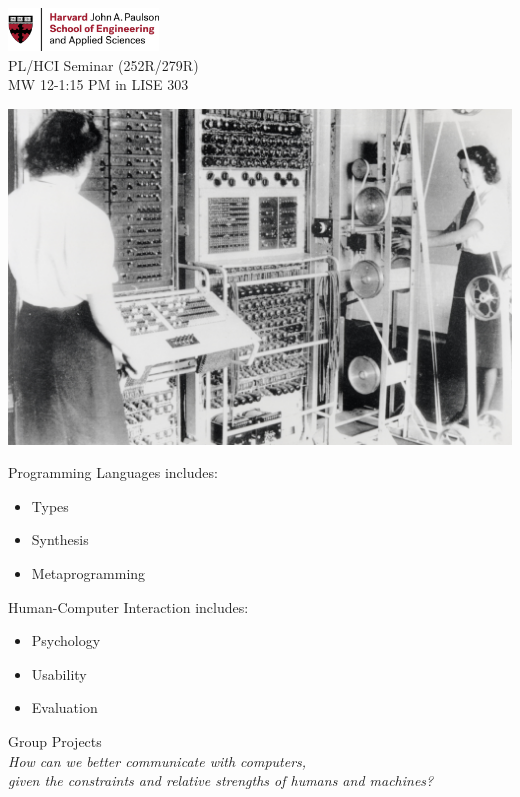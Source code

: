 \documentclass[14pt]{extarticle}
\begin{document}
\begin{center}
\includegraphics[width=0.3\textwidth]{H_SEAS_logo_RGB.jpg}
\\
\huge{PL/HCI Seminar (252R/279R)}\\
\large{MW 12-1:15 PM in LISE 303}\\
\end{center}

\includegraphics[width=\textwidth]{Colossus.jpg}




\begin{multicols}{2}
Programming Languages includes:
\begin{itemize}
\item Types
\item Synthesis
\item Metaprogramming
\end{itemize}

\columnbreak
Human-Computer Interaction includes:
\begin{itemize}
\item Psychology
\item Usability
\item Evaluation
\end{itemize}

\end{multicols}

\begin{center}
\large{Group Projects}\\
\normalsize{\emph{How can we better communicate with computers, \\given the constraints and relative strengths of humans and machines?}}
\end{center}
\end{document}
